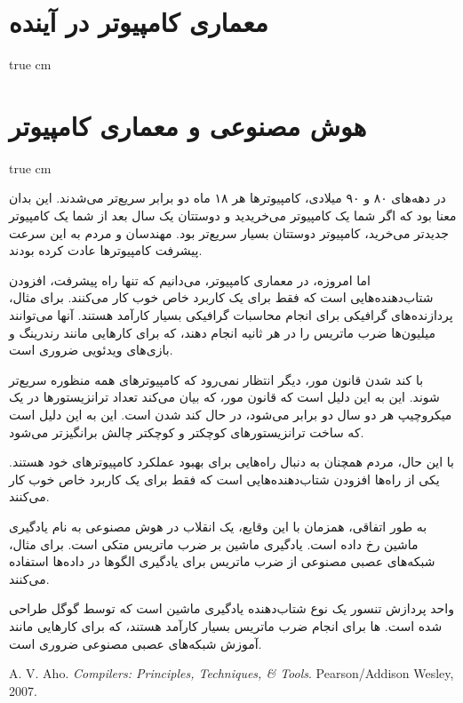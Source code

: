 \documentclass[11pt, twoside]{imsproc}
\let\LTRfootnote\footnoteA
\begin{document}
\section{معماری کامپیوتر در آینده}
 true cm

\section{هوش مصنوعی و معماری کامپیوتر}
 true cm

در دهه‌های ۸۰ و ۹۰ میلادی، کامپیوترها هر ۱۸ ماه دو برابر سریع‌تر می‌شدند. این بدان معنا بود که اگر شما یک کامپیوتر می‌خریدید و دوستتان یک سال بعد از شما یک کامپیوتر جدیدتر می‌خرید، کامپیوتر دوستتان بسیار سریع‌تر بود. مهندسان و مردم به این سرعت پیشرفت کامپیوترها عادت کرده بودند.

اما امروزه، در معماری کامپیوتر، می‌دانیم که تنها راه پیشرفت، افزودن شتاب‌دهنده‌هایی است که فقط برای یک کاربرد خاص خوب کار می‌کنند. برای مثال، پردازنده‌های گرافیکی\LTRfootnote{\lr{GPU}} برای انجام محاسبات گرافیکی بسیار کارآمد هستند. آنها می‌توانند میلیون‌ها ضرب ماتریس را در هر ثانیه انجام دهند، که برای کارهایی مانند رندرینگ  و بازی‌های ویدئویی ضروری است.

با کند شدن قانون مور، دیگر انتظار نمی‌رود که کامپیوترهای همه منظوره سریع‌تر شوند. این به این دلیل است که قانون مور، که بیان می‌کند تعداد ترانزیستورها در یک میکروچیپ هر دو سال دو برابر می‌شود، در حال کند شدن است. این به این دلیل است که ساخت ترانزیستورهای کوچکتر و کوچکتر چالش برانگیزتر می‌شود.

با این حال، مردم همچنان به دنبال راه‌هایی برای بهبود عملکرد کامپیوترهای خود هستند. یکی از راه‌ها افزودن شتاب‌دهنده‌هایی است که فقط برای یک کاربرد خاص خوب کار می‌کنند.

به طور اتفاقی، همزمان با این وقایع، یک انقلاب در هوش مصنوعی به نام یادگیری ماشین رخ داده است. یادگیری ماشین بر ضرب ماتریس متکی است. برای مثال، شبکه‌های عصبی مصنوعی  از ضرب ماتریس برای یادگیری الگوها در داده‌ها استفاده می‌کنند.

واحد پردازش تنسور  یک نوع شتاب‌دهنده یادگیری ماشین است که توسط گوگل طراحی شده است. ها برای انجام ضرب ماتریس بسیار کارآمد هستند، که برای کارهایی مانند آموزش شبکه‌های عصبی مصنوعی  ضروری است.

\begin{thebibliography}{99}%
\begin{LTRbibitems}
\resetlatinfont

A. V. Aho. \emph{Compilers: Principles, Techniques, \& Tools}. Pearson/Addison Wesley, 2007.
\end{LTRbibitems}
\end{thebibliography}
\end{document}
